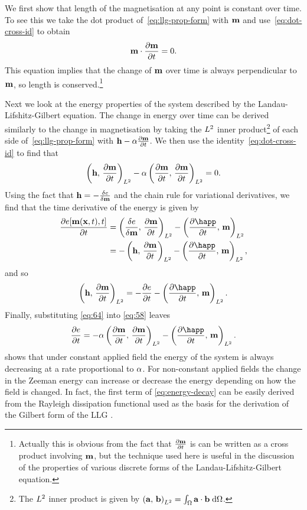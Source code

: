 We first show that length of the magnetisation at any point is constant over time.
To see this we take the dot product of~\cref{eq:llg-prop-form} with $\boldsymbol{\mathrm{m}}$ and use~\cref{eq:dot-cross-id} to obtain
\begin{equation}
  \label{eq:56}
  \boldsymbol{\mathrm{m}} \cdot \frac{\partial \boldsymbol{\mathrm{m}}}{\partial t} = 0.
\end{equation}
This equation implies that the change of $\boldsymbol{\mathrm{m}}$ over time is always perpendicular to $\boldsymbol{\mathrm{m}}$, so length is conserved.\footnote{Actually this is obvious from the fact that $\frac{\partial \boldsymbol{\mathrm{m}}}{\partial t}$ is can be written as a cross product involving $\boldsymbol{\mathrm{m}}$, but the technique used here is useful in the discussion of the properties of various discrete forms of the Landau-Lifshitz-Gilbert equation.}

Next we look at the energy properties of the system described by the Landau-Lifshitz-Gilbert equation.
The change in energy over time can be derived similarly to the change in magnetisation by taking the ${L^2}$ inner product\footnote{The ${L^2}$ inner product is given by $\left({\boldsymbol{\mathrm{a}}},\, {\boldsymbol{\mathrm{b}}} \right)_{{L^2}} = \int_\Omega {\boldsymbol{\mathrm{a}}} \cdot {\boldsymbol{\mathrm{b}}} {\; \mathrm{{d}}}\Omega$.} of each side of~\cref{eq:llg-prop-form} with $\boldsymbol{\mathrm{h}} - \alpha \frac{\partial \boldsymbol{\mathrm{m}}}{\partial t}$.
We then use the identity~\cref{eq:dot-cross-id} to find that
\begin{equation}
  \label{eq:58}
  \left(\boldsymbol{\mathrm{h}},\, \frac{\partial \boldsymbol{\mathrm{m}}}{\partial t} \right)_{{L^2}} - \alpha \left(\frac{\partial \boldsymbol{\mathrm{m}}}{\partial t},\, \frac{\partial \boldsymbol{\mathrm{m}}}{\partial t} \right)_{{L^2}} = 0.
\end{equation}
Using the fact that $\boldsymbol{\mathrm{h}} = -\frac{\delta e}{\delta \boldsymbol{\mathrm{m}}}$ and the chain rule for variational derivatives, we find that the time derivative of the energy is given by
\begin{align*}
  \pd{\e[\mv(\xv, t), t]}{t} &= \ltip{\vd{e}{\mv}}{\dmdt} - \ltip{\pd{\happ}{t}}{\mv} \\
                             &= -\ltip{\hv}{\dmdt} - \ltip{\pd{\happ}{t}}{\mv},
\end{align*}
and so
\begin{equation}
  \ltip{\hv}{\dmdt} = -\pd{\e}{t} - \ltip{\pd{\happ}{t}}{\mv}.
  \label{eq:64}
\end{equation}
Finally, substituting \cref{eq:64} into \cref{eq:58} leaves
\begin{equation}
  \label{eq:energy-decay}
  \pd{\e}{t} = -\dampc \ltip{\dmdt}{\dmdt} - \ltip{\pd{\happ}{t}}{\mv}.
\end{equation}
 shows that under constant applied field the energy of the system is always decreasing at a rate proportional to $\alpha$.
For non-constant applied fields the change in the Zeeman energy can increase or decrease the energy depending on how the field is changed. %
In fact, the first term of \cref{eq:energy-decay} can be easily derived from the Rayleigh dissipation functional used as the basis for the derivation of the Gilbert form of the LLG \cite{Gilbert2004}.

